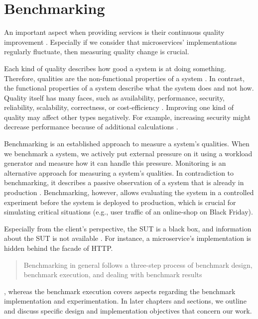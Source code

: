 \section{Benchmarking}
\label{sec:bg_benchmarking}
An important aspect when providing services is their continuous quality improvement \cite[][p. 28]{Bermbach_Cloud_Service_Benchmarking_2017}. Especially if we consider that microservices' implementations regularly fluctuate, then measuring quality change is crucial.

Each kind of quality describes how good a system is at doing something. Therefore, qualities are the non-functional properties of a system \cite[][p. 17]{Bermbach_Cloud_Service_Benchmarking_2017}. In contrast, the functional properties of a system describe what the system does and not how. Quality itself has many faces, such as availability, performance, security, reliability, scalability, correctness, or cost-efficiency \cite[][p. 19-22]{Bermbach_Cloud_Service_Benchmarking_2017}. Improving one kind of quality may affect other types negatively. For example, increasing security might decrease performance because of additional calculations \cite[][p. 24]{Bermbach_Cloud_Service_Benchmarking_2017}.

Benchmarking is an established approach to measure a system's qualities. When we benchmark a system, we actively put external pressure on it using a workload generator and measure how it can handle this pressure. Monitoring is an alternative approach for measuring a system's qualities. In contradiction to benchmarking, it describes a passive observation of a system that is already in production \cite[][p. 24]{Bermbach_Cloud_Service_Benchmarking_2017}. Benchmarking, however, allows evaluating the system in a controlled experiment before the system is deployed to production, which is crucial for simulating critical situations (e.g., user traffic of an online-shop on Black Friday).

Especially from the client's perspective, the SUT is a black box, and information about the SUT is not available \cite[][p. 11-12]{Bermbach_Cloud_Service_Benchmarking_2017}.  For instance, a microservice's implementation is hidden behind the facade of HTTP. 

\blockquote{Benchmarking in general follows a three-step process of benchmark design, benchmark execution, and dealing with benchmark results} \cite[][p. 14-16]{Bermbach_Cloud_Service_Benchmarking_2017}, whereas the benchmark execution covers aspects regarding the benchmark implementation and experimentation.
In later chapters and sections, we outline and discuss specific design and implementation objectives that concern our work.
